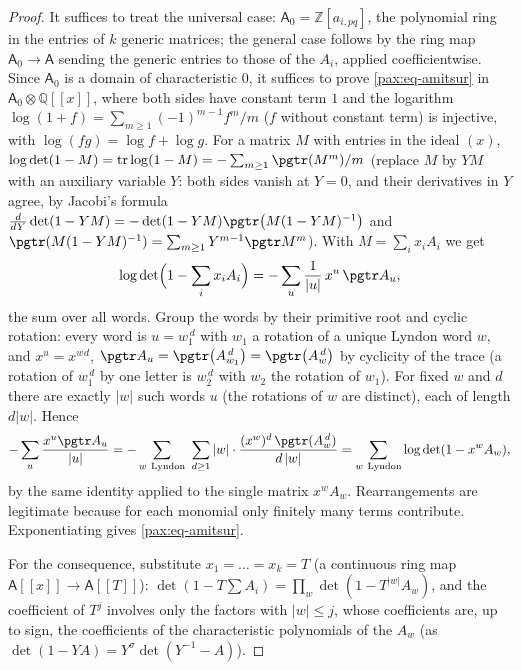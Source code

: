 \documentclass[10pt]{amsart}
\theoremstyle{definition}
\theoremstyle{remark}
\newcommand{\Z}{\mathbb Z}
\newcommand{\Q}{\mathbb Q}
\begin{document}
\begin{proof}
It suffices to treat the universal case: $\mathsf A_0=\Z[a_{i,pq}]$, the polynomial ring in the
entries of $k$ generic matrices; the general case follows by the ring map $\mathsf A_0\to\mathsf A$
sending the generic entries to those of the $A_i$, applied coefficientwise. Since $\mathsf A_0$ is a
domain of characteristic $0$, it suffices to prove \eqref{pax:eq-amitsur} in $\mathsf A_0\otimes
\Q[[x]]$, where both sides have constant term $1$ and the logarithm $\log(1+f)=\sum_{m\ge1}
(-1)^{m-1}f^m/m$ ($f$ without constant term) is injective, with $\log(fg)=\log f+\log g$. For a matrix
$M$ with entries in the ideal $(x)$, $\log\det(1-M)=\operatorname{tr}\log(1-M)=-\sum_{m\ge1}\pgtr
(M^m)/m$ (replace $M$ by $YM$ with an auxiliary variable $Y$: both sides vanish at $Y=0$, and their
derivatives in $Y$ agree, by Jacobi's formula $\frac{d}{dY}\det(1-YM)=-\det(1-YM)\pgtr\bigl(M(1-YM)^{-1}
\bigr)$ and $\pgtr(M(1-YM)^{-1})=\sum_{m\ge1}Y^{m-1}\pgtr M^m$). With $M=\sum_ix_iA_i$ we get
\[
\log\det\Bigl(1-\sum_ix_iA_i\Bigr)=-\sum_{u}\frac1{|u|}\,x^u\,\pgtr A_u,
\]
the sum over all words. Group the words by their primitive root and cyclic rotation: every word is
$u=w_1^{\,d}$ with $w_1$ a rotation of a unique Lyndon word $w$, and $x^u=x^{w}{}^{d}$, $\pgtr A_u=
\pgtr\bigl(A_{w_1}^{\,d}\bigr)=\pgtr\bigl(A_w^{\,d}\bigr)$ by cyclicity of the trace (a rotation of
$w_1^{\,d}$ by one letter is $w_2^{\,d}$ with $w_2$ the rotation of $w_1$). For fixed $w$ and $d$ there
are exactly $|w|$ such words $u$ (the rotations of $w$ are distinct), each of length $d|w|$. Hence
\[
-\sum_u\frac{x^u\pgtr A_u}{|u|}=-\sum_{w\ \mathrm{Lyndon}}\ \sum_{d\ge1}|w|\cdot\frac{(x^w)^d\,
\pgtr(A_w^{\,d})}{d\,|w|}=\sum_{w\ \mathrm{Lyndon}}\log\det(1-x^wA_w),
\]
by the same identity applied to the single matrix $x^wA_w$. Rearrangements are legitimate because for
each monomial only finitely many terms contribute. Exponentiating gives \eqref{pax:eq-amitsur}.

For the consequence, substitute $x_1=\dots=x_k=T$ (a continuous ring map $\mathsf A[[x]]\to\mathsf
A[[T]]$): $\det(1-T\sum A_i)=\prod_w\det(1-T^{|w|}A_w)$, and the coefficient of $T^j$ involves only the
factors with $|w|\le j$, whose coefficients are, up to sign, the coefficients of the characteristic
polynomials of the $A_w$ (as $\det(1-YA)=Y^\sigma\det(Y^{-1}-A)$).
\end{proof}
\end{document}
